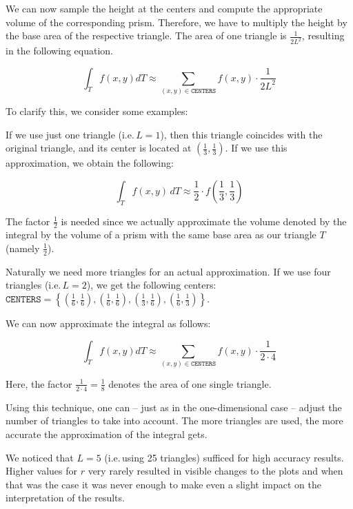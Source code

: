 \documentclass{article}
\newcommand{\todo}[2][]{\textcolor{red}{TODO\ifthenelse{\equal{#1}{}}{}{[#1]}: #2}}
\newcommand{\done}[2][]{\textcolor{green!50!black}{DONE\ifthenelse{\equal{#1}{}}{}{[#1]}: #2}}
\newcommand{\remark}[2][]{\textcolor{red!70!yellow}{REMARK\ifthenelse{\equal{#1}{}}{}{[#1]}: #2}}
\begin{document}
We can now sample the height at the centers and compute the appropriate volume of the corresponding prism. Therefore, we have to multiply the height by the base area of the respective triangle. The area of one triangle is $\frac{1}{2 L^2}$, resulting in the following equation.

\begin{equation}
  \int_T f(x,y) dT \approx \sum_{(x,y)\in\mathtt{CENTERS}} f(x,y) \cdot \frac{1}{2L^2}
\end{equation}

To clarify this, we consider some examples:

If we use just one triangle (i.e.\,$L=1$), then this triangle coincides with the original triangle, and its center is located at $(\frac{1}{3}, \frac{1}{3})$. If we use this approximation, we obtain the following:

\begin{equation*}
  \int_T f(x,y)\, dT \approx \frac{1}{2} \cdot f(\frac{1}{3},\frac{1}{3})
\end{equation*}

The factor $\frac{1}{2}$ is needed since we actually approximate the volume denoted by the integral by the volume of a prism with the same base area as our triangle $T$ (namely $\frac{1}{2}$).

Naturally we need more triangles for an actual approximation. If we use four triangles (i.e.\,$L=2$), we get the following centers: $\mathtt{CENTERS} = \left\{ (\frac{1}{6}, \frac{1}{6}), (\frac{1}{6}, \frac{1}{6}), (\frac{1}{3}, \frac{1}{6}), (\frac{1}{6},\frac{1}{3}) \right\}$.

We can now approximate the integral as follows:

\begin{equation*}
  \int_T f(x,y) dT \approx \sum_{(x,y)\in\mathtt{CENTERS}} f(x,y)\cdot \frac{1}{2\cdot 4}
\end{equation*}

Here, the factor $\frac{1}{2\cdot 4} = \frac{1}{8}$ denotes the area of one single triangle.

Using this technique, one can -- just as in the one-dimensional case -- adjust the number of triangles to take into account. The more triangles are used, the more accurate the approximation of the integral gets.

We noticed that $L=5$ (i.e.\,using 25 triangles) sufficed for high accuracy results. Higher values for $r$ very rarely resulted in visible changes to the plots and when that was the case it was never enough to make even a slight impact on the interpretation of the results.
\end{document}
